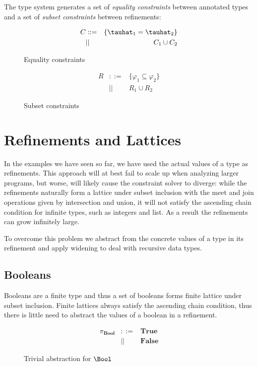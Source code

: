 The type system generates a set of \emph{equality constraints} between annotated types and a set of \emph{subset constraints} between refinements:
\begin{figure}[h!t]
\begin{eqnarray*}
C &::=& \{\tauhat_1 = \tauhat_2\} \\
  &||&  C_1 \cup C_2
\end{eqnarray*}
\caption{Equality constraints}
\label{figeqc}
\end{figure}

\begin{figure}[h!t]
\begin{eqnarray*}
R &::=& \{\varphi_1 \subseteq \varphi_2\} \\
  &||&  R_1 \cup R_2
\end{eqnarray*}
\caption{Subset constraints}
\label{figsubtype}
\end{figure}

\section{Refinements and Lattices}\label{secabstractvalues}

In the examples we have seen so far, we have used the actual values of a type as refinements. This approach will at best fail to scale up when analyzing larger programs, but worse, will likely cause the constraint solver to diverge: while the refinements naturally form a lattice under subset inclusion with the meet and join operations given by intersection and union, it will not satisfy the ascending chain condition for infinite types, such as integers and list. As a result the refinements can grow infinitely large.

To overcome this problem we abstract from the concrete values of a type in its refinement and apply widening to deal with recursive data types.

\subsection{Booleans}

Booleans are a finite type and thus a set of booleans forms finite lattice under subset inclusion. Finite lattices always satisfy the ascending chain condition, thus there is little need to abstract the values of a boolean in a refinement.

\begin{figure}[h!t]
\begin{eqnarray*}
\pi_\mathbf{Bool} &::=& \textbf{True}  \\
                  &||&  \textbf{False}
\end{eqnarray*}
\caption{Trivial abstraction for $\Bool$}
\label{LatticeBool}
\end{figure}

